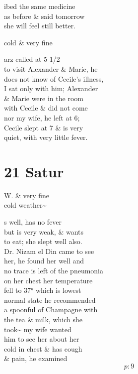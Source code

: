 \documentclass{report}
\begin{document}

	\par{
 	ibed the same medicine\ \\as before \& said tomorrow\ \\she will feel still better.\ \\
	}

	\par{
 	cold \& very fine\ \\
	}

	\par{
 	arz called at 5 1/2\ \\to visit Alexander \& Marie, he\ \\does not know of Cecile's illness,\ \\I sat only with him; Alexander\ \\\& Marie were in the room\ \\with Cecile \& did not come\ \\nor my wife, he left at 6;\ \\Cecile slept at 7 \& is very\ \\quiet, with very little fever.\ \\
	}

	\chapter{21 Satur\ \\}

	\par{
 	
	}

	\par{
 	W. \& very fine\ \\cold weather\~{}\ \\
	}

	\par{
 	s well, has no fever\ \\but is very weak, \& wants\ \\to eat; she slept well also.\ \\Dr. Nizam el Din came to see\ \\her, he found her well and\ \\no trace is left of the pneumonia\ \\on her chest her temperature\ \\fell to 37° which is lowest\ \\normal state he recommended\ \\a spoonful of Champagne with\ \\the tea \& milk, which she\ \\took\~{} my wife wanted\ \\him to see her about her\ \\cold in chest \& has cough\ \\\& pain, he examined\ \\
  \[p: 9 \]

	}
\end{document}
